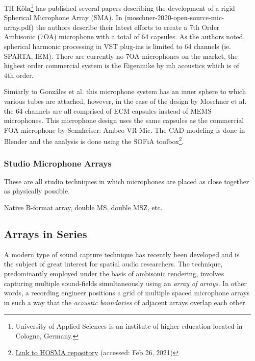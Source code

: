 TH Köln\footnote{University of Applied Sciences is an institute of higher education located in Cologne, Germany.} has published several papers describing the development of a rigid Spherical Microphone Array (SMA). In (moschner-2020-open-source-mic-array.pdf) the authors describe their latest efforts to create a 7th Order Ambisonic (7OA) microphone with a total of 64 capsules. As the authors noted, spherical harmonic processing in VST plug-ins is limited to 64 channels (ie. SPARTA, IEM).  There are currently no 7OA microphones on the market, the highest order commercial system is the Eigenmike by mh acoustics which is of 4th order. 

Simiarly to Gonzáles et al. this microphone system has an inner sphere to which various tubes are attached, however, in the case of the design by Moschner et al. the 64 channels are all comprised of ECM capsules instead of MEMS microphones. This microphone design uses the same capsules as the commercial FOA microphone by Sennheiser: Ambeo VR Mic. The CAD modeling is done in Blender and the analysis is done using the SOFiA toolbox\footnote{\href{https://github.com/AudioGroupCologne/hosma}{Link to HOSMA repository} (accessed: Feb 26, 2021)}. 




\subsubsection{Studio Microphone Arrays}

These are all studio techniques in which microphones are placed as close together as physically possible. 

Native B-format array, double MS, double MSZ, etc.

\subsection{Arrays in Series}

A modern type of sound capture technique has recently been developed and is the subject of great interest for spatial audio researchers. The technique, predominantly employed under the basis of ambisonic rendering, involves capturing multiple sound-fields simultaneously using an \textit{array of arrays}. In other words, a recording engineer positions a grid of multiple spaced microphone arrays in such a way that the \textit{acoustic boundaries} of adjacent arrays overlap each other. 

